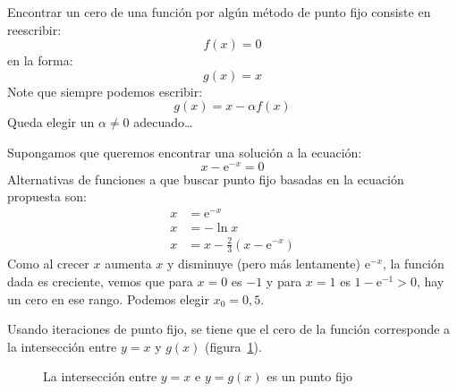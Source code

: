   Encontrar un cero de una función por algún método de punto fijo
  consiste en reescribir:
  \begin{equation*}
    f(x)
      = 0
  \end{equation*}
  en la forma:
  \begin{equation*}
    g(x)
      = x
  \end{equation*}
  Note que siempre podemos escribir:
  \begin{equation*}
    g(x)
      = x - \alpha f(x)
  \end{equation*}
  Queda elegir un \(\alpha \ne 0\) adecuado\ldots
  \begin{ejemplo}
    Supongamos que queremos encontrar una solución a la ecuación:
    \begin{equation*}
      x - \mathrm{e}^{-x}
        = 0
    \end{equation*}
    Alternativas de funciones a que buscar punto fijo
    basadas en la ecuación propuesta son:
    \begin{align*}
      x
        &= \mathrm{e}^{-x} \\
      x
        &= - \ln x \\
      x
        &= x - \frac{2}{3} (x - \mathrm{e}^{-x})
    \end{align*}
    Como al crecer \(x\) aumenta \(x\)
    y disminuye (pero más lentamente) \(\mathrm{e}^{-x}\),
    la función dada es creciente,
    vemos que para \(x = 0\) es \(-1\)
    y para \(x = 1\) es \(1 - \mathrm{e}^{-1} > 0\),
    hay un cero en ese rango.
    Podemos elegir \(x_0 = 0,5\).
  \end{ejemplo}
  Usando iteraciones de punto fijo,
  se tiene que el cero de la función
  corresponde a la intersección entre \(y = x\) y \(g(x)\)
  (figura~\ref{01::FPI}).
  \begin{figure}[ht]
    \centering
    \caption{La intersección entre \(y = x\)
             e \(y = g(x)\) es un punto fijo}
    \label{01::FPI}
  \end{figure}
